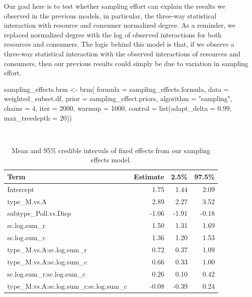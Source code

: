 \documentclass[11pt,]{article}
\newenvironment{Shaded}{}{}
\newcommand{\KeywordTok}[1]{\textcolor[rgb]{0.00,0.00,1.00}{#1}}
\newcommand{\DataTypeTok}[1]{#1}
\newcommand{\DecValTok}[1]{#1}
\newcommand{\FloatTok}[1]{#1}
\newcommand{\StringTok}[1]{\textcolor[rgb]{0.00,0.50,0.50}{#1}}
\newcommand{\NormalTok}[1]{#1}
\begin{document}
Our goal here is to test whether sampling effort can explain the results
we observed in the previous models, in particular, the three-way
statistical interaction with resource and consumer normalized degree. As
a reminder, we replaced normalized degree with the log of observed
interactions for both resources and consumers. The logic behind this
model is that, if we observe a three-way statistical interaction with
the observed interactions of resources and consumers, then our previous
results could simply be due to variation in sampling effort.

\begin{Shaded}
\begin{Highlighting}[]
\NormalTok{sampling_effects.brm <-}\StringTok{ }\KeywordTok{brm}\NormalTok{(}
  \DataTypeTok{formula =}\NormalTok{ sampling_effects.formula, }\DataTypeTok{data =}\NormalTok{ weighted_subset.df, }
  \DataTypeTok{prior =}\NormalTok{ sampling_effect.priors, }\DataTypeTok{algorithm =} \StringTok{"sampling"}\NormalTok{, }
  \DataTypeTok{chains =} \DecValTok{4}\NormalTok{, }\DataTypeTok{iter =} \DecValTok{2000}\NormalTok{, }\DataTypeTok{warmup =} \DecValTok{1000}\NormalTok{,}
  \DataTypeTok{control =} \KeywordTok{list}\NormalTok{(}\DataTypeTok{adapt_delta =} \FloatTok{0.99}\NormalTok{, }\DataTypeTok{max_treedepth =} \DecValTok{20}\NormalTok{))}
\end{Highlighting}
\end{Shaded}

~

\begin{table}[!h]

\caption{\label{tab:sampling-table}Mean and 95\% credible intervals of fixed effects from our sampling effects model.}
\centering
\begin{tabular}{lrrr}
\toprule
Term & Estimate & 2.5\% & 97.5\%\\
\midrule
\rowcolor{gray!6}  Intercept & 1.75 & 1.44 & 2.09\\
type\_M.vs.A & 2.89 & 2.27 & 3.52\\
\rowcolor{gray!6}  subtype\_Poll.vs.Disp & -1.06 & -1.91 & -0.18\\
sc.log.sum\_r & 1.50 & 1.31 & 1.69\\
\rowcolor{gray!6}  sc.log.sum\_c & 1.36 & 1.20 & 1.53\\
\addlinespace
type\_M.vs.A:sc.log.sum\_r & 0.72 & 0.37 & 1.09\\
\rowcolor{gray!6}  type\_M.vs.A:sc.log.sum\_c & 0.66 & 0.33 & 1.00\\
sc.log.sum\_r:sc.log.sum\_c & 0.26 & 0.10 & 0.42\\
\rowcolor{gray!6}  type\_M.vs.A:sc.log.sum\_r:sc.log.sum\_c & -0.08 & -0.39 & 0.24\\
\bottomrule
\end{tabular}
\end{table}
\end{document}

